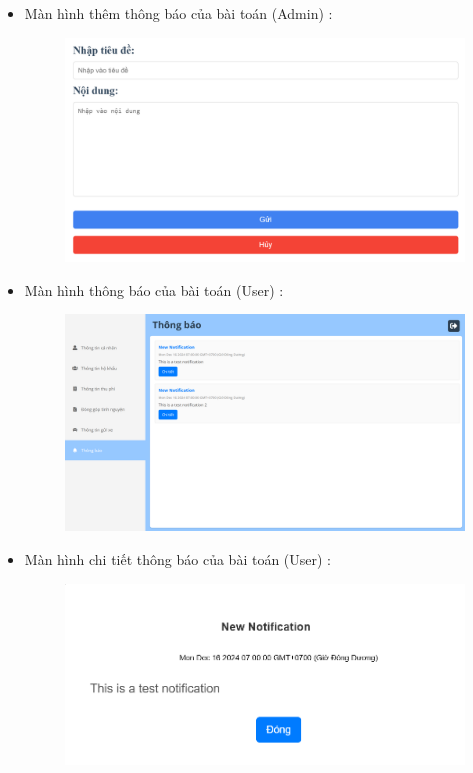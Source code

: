 \documentclass{article}
\begin{document}
\begin{itemize}
\begin{figure}[H]
    \end{figure}
    \newpage
    \item Màn hình thêm thông báo của bài toán (Admin) :
    \begin{figure}[H]
        \centering
        \includegraphics[width=1\textwidth]{Ảnh chương 4/Thêm thông báo 1.png}
    \end{figure}
    \item Màn hình thông báo của bài toán (User) :
    \begin{figure}[H]
        \centering
        \includegraphics[width=1\textwidth]{Ảnh chương 4/Thông báo 2.png}
    \end{figure}
    \newpage
    \item Màn hình chi tiết thông báo của bài toán (User) :
    \begin{figure}[H]
        \centering
        \includegraphics[width=1\textwidth]{Ảnh chương 4/Chi tiết thông báo 1.png}
    \end{figure}


\end{itemize}
\end{document}

